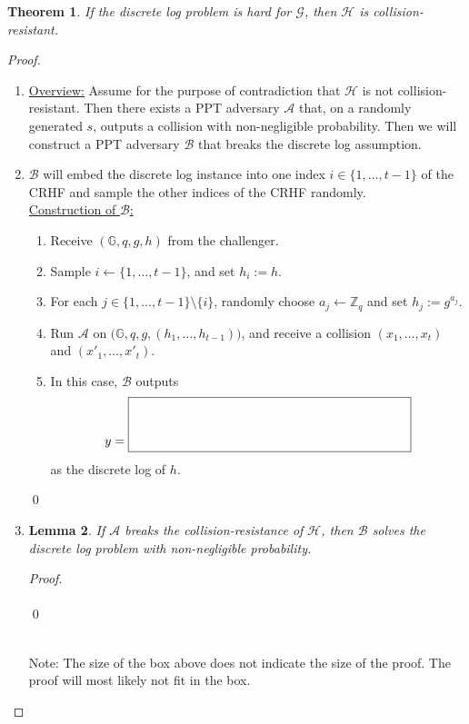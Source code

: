 \documentclass[11pt]{article}
\newcommand\custombox[2]{%
    \fbox{\rule{#1}{0pt}\rule[-0.5ex]{0pt}{#2}}}
\newtheorem{theorem}{Theorem}[section]
\newtheorem{lemma}[theorem]{Lemma}
\numberwithin{equation}{section}
\newcommand{\A}{\mathcal{A}}
\newcommand{\B}{\mathcal{B}}
\newcommand{\GG}{\mathbb{G}}
\newcommand{\ZZ}{\mathbb{Z}}
\newenvironment{solution}{\color{blue}\noindent{\bf Solution}\hspace*{1em}}{\qed\medskip}
\begin{document}
\begin{theorem}\label{thm:dlog-implies-CRHF-security}
    If the discrete log problem is hard for $\mathcal{G}$, then $\mathcal{H}$ is collision-resistant.
\end{theorem}

\begin{proof}
\begin{enumerate}
    \item \underline{Overview:} Assume for the purpose of contradiction that $\mathcal{H}$ is not collision-resistant. Then there exists a PPT adversary $\A$ that, on a randomly generated $s$, outputs a collision with non-negligible probability. Then we will construct a PPT adversary $\B$ that breaks the discrete log assumption.
    \item $\B$ will embed the discrete log instance into one index $i \in \{1, \dots, t-1\}$ of the CRHF and sample the other indices of the CRHF randomly.\\
    
    \underline{Construction of $\B$:}
    \begin{enumerate}
        \item Receive $(\GG, q, g, h)$ from the challenger.
        \item Sample $i \gets \{1,\dots, t-1\}$, and set $h_i := h$.
        \item For each $j \in \{1,\dots, t-1\} \setminus\{i\}$, randomly choose $a_j \gets \ZZ_q$ and set $h_j := g^{a_j}$.
        \item Run $\A$ on $\big( \GG, q, g, (h_1,\dots, h_{t-1}) \big)$, and receive a collision $(x_1, \dots, x_t)$ and $(x'_1, \dots, x'_t)$.
        \item In this case, $\B$ outputs
        \[y = \custombox{3in}{.5in}\]
        as the discrete log of $h$.
    \end{enumerate}
    \begin{solution}
            
    \end{solution}

    \item \begin{lemma}\label{thm:B-breaks-dlog}
        If $\A$ breaks the collision-resistance of $\mathcal{H}$, then $\B$ solves the discrete log problem with non-negligible probability.
    \end{lemma}
    \begin{proof}\\
    
        \custombox{5in}{.5in}\\
        
        \begin{solution}
        \end{solution}
    \end{proof}\\
    Note: The size of the box above does not indicate the size of the proof. The proof will most likely not fit in the box.
\end{enumerate}
\end{proof}
\pagebreak
\end{document}
